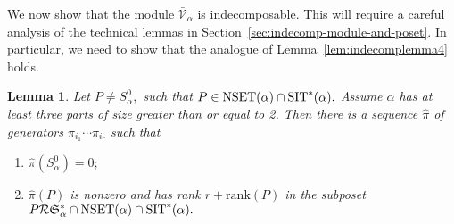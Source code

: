 \documentclass[12pt,letterpaper]{amsart}
\newtheorem{lemma}[theorem]{Lemma}
\theoremstyle{definition}
\newcommand{\rdI}{\mathcal{R}\mathfrak{S}^*}
\begin{document}
We now  show that the module $\mathcal{\bar V}_{\alpha}$ is indecomposable.  This will require a  careful analysis of the technical lemmas in Section~\ref{sec:indecomp-module-and-poset}. In particular,  we need to show that the analogue of Lemma~\ref{lem:indecomplemma4} holds.

\begin{lemma}\label{lem:indecomplemma*}  Let $P\ne S^0_\alpha,$ such that $P\in \operatorname{NSET}(\alpha)\cap\operatorname{SIT}^*(\alpha).$   Assume $\alpha$ has at least three parts of size greater than or equal to 2. 
Then there  is a sequence $\hat\pi$ of generators $\pi_{i_1}\cdots \pi_{i_r}$ such that 
\begin{enumerate}
\item  $\hat\pi(S^0_\alpha)=0;$  
\item $\hat\pi(P)$ is nonzero and has rank $r+\mathrm{rank}(P)$ in the subposet $P\rdI_\alpha\cap\NSET(\alpha)\cap\SIT^*(\alpha).$   
\end{enumerate}
\end{lemma}
\end{document}

